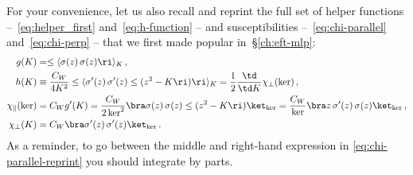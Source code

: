 For your convenience, let us also recall and reprint the full set of helper functions --~\eqref{eq:helper_first} and~\eqref{eq:h-function} --  and susceptibilities --~\eqref{eq:chi-parallel} and~\eqref{eq:chi-perp} -- that we first made popular 
in~\S\ref{ch:eft-mlp}: 
\begin{align}
g(K)&=\le\langle \sigma(z)\, \sigma(z)\ri\rangle_{K}\, ,\label{eq:g-function-reprint}\\
h(K)&\equiv \frac{C_W}{4K^2}\le\langle \sigma'(z)\, \sigma'(z)\le(z^2-K\ri)\ri\rangle_{K}=\frac{1}{2}\frac{\td }{\td K}\chi_{\perp}(\ker)\, ,\label{eq:h-function-reprint}\\
\chi_{\parallel}(\ker)&=C_W g'(K)=\frac{C_W}{2\ker^2} \bra \sigma(z)\, \sigma(z)\le(z^2-K\ri)\ket_{\ker}=\frac{C_W}{\ker} \bra z\, \sigma'(z)\, \sigma(z)\ket_{\ker}\, ,\label{eq:chi-parallel-reprint}\\
\chi_{\perp}(K)&=C_W \bra\sigma^\prime(z)\, \sigma^\prime(z) \ket_{\ker}\, .\label{eq:chi-perp-reprint}
\end{align}
As a reminder, to go between the middle and right-hand expression in \eqref{eq:chi-parallel-reprint} you should integrate by parts.









